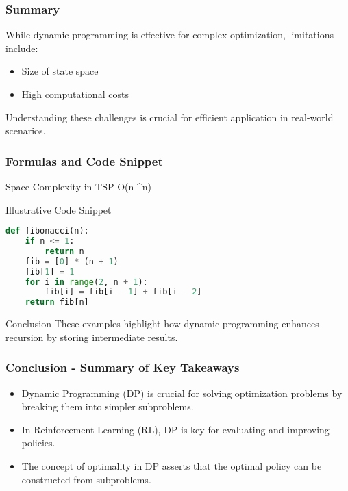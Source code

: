 \documentclass[aspectratio=169]{beamer}
\begin{document}
\begin{frame}[fragile]
    \frametitle{Summary}
    While dynamic programming is effective for complex optimization, limitations include:
    \begin{itemize}
        \item Size of state space
        \item High computational costs
    \end{itemize}
    
    Understanding these challenges is crucial for efficient application in real-world scenarios.
\end{frame}

\begin{frame}[fragile]
    \frametitle{Formulas and Code Snippet}
    \begin{block}{Space Complexity in TSP}
        O(n ^n)
    \end{block}

    \begin{block}{Illustrative Code Snippet}
        \begin{lstlisting}[language=Python]
def fibonacci(n):
    if n <= 1:
        return n
    fib = [0] * (n + 1)
    fib[1] = 1
    for i in range(2, n + 1):
        fib[i] = fib[i - 1] + fib[i - 2]
    return fib[n]
        \end{lstlisting}
    \end{block}
    
    \begin{block}{Conclusion}
        These examples highlight how dynamic programming enhances recursion by storing intermediate results.
    \end{block}
\end{frame}

\begin{frame}[fragile]
    \frametitle{Conclusion - Summary of Key Takeaways}
    \begin{itemize}
        \item Dynamic Programming (DP) is crucial for solving optimization problems by breaking them into simpler subproblems.
        \item In Reinforcement Learning (RL), DP is key for evaluating and improving policies.
        \item The concept of optimality in DP asserts that the optimal policy can be constructed from subproblems.
    \end{itemize}
\end{frame}
\end{document}
